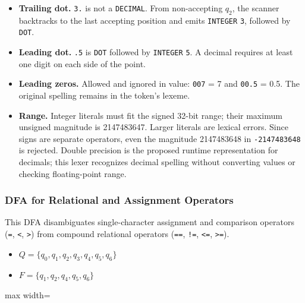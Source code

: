 \documentclass[11pt,a4paper]{article}
\newcommand{\token}[1]{\texttt{#1}}
\newcommand{\codeinline}[1]{\texttt{#1}}
\begin{document}
\begin{itemize}
  \item \textbf{Trailing dot.} \codeinline{3.} is not a \token{DECIMAL}. From non-accepting $q_2$, the scanner backtracks to the last accepting position and emits \token{INTEGER} \codeinline{3}, followed by \token{DOT}.
  \item \textbf{Leading dot.} \codeinline{.5} is \token{DOT} followed by \token{INTEGER} \codeinline{5}. A decimal requires at least one digit on each side of the point.
  \item \textbf{Leading zeros.} Allowed and ignored in value: \codeinline{007} = 7 and \codeinline{00.5} = 0.5. The original spelling remains in the token's lexeme.
  \item \textbf{Range.} Integer literals must fit the signed 32-bit range; their maximum unsigned magnitude is 2147483647. Larger literals are lexical errors. Since signs are separate operators, even the magnitude 2147483648 in \codeinline{-2147483648} is rejected. Double precision is the proposed runtime representation for decimals; this lexer recognizes decimal spelling without converting values or checking floating-point range.
\end{itemize}

\subsubsection{DFA for Relational and Assignment Operators}

This DFA disambiguates single-character assignment and comparison operators (\codeinline{=}, \codeinline{<}, \codeinline{>}) from compound relational operators (\codeinline{==}, \codeinline{!=}, \codeinline{<=}, \codeinline{>=}).

\begin{itemize}
  \item $Q=\{q_0,q_1,q_2,q_3,q_4,q_5,q_6\}$
  \item $F=\{q_1,q_2,q_4,q_5,q_6\}$
\end{itemize}

\begin{center}
\begin{adjustbox}{max width=\linewidth}
\end{adjustbox}
\end{center}
\end{document}
